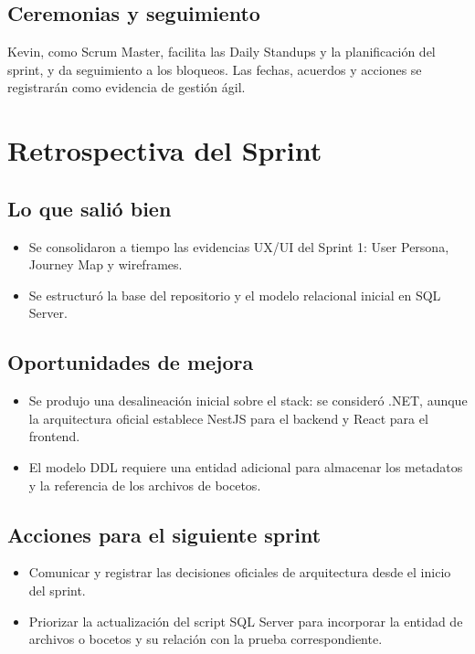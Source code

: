 \documentclass[12pt,a4paper]{article}
\begin{document}
\subsection{Ceremonias y seguimiento}
Kevin, como Scrum Master, facilita las Daily Standups y la planificación del sprint,
y da seguimiento a los bloqueos. Las fechas, acuerdos y acciones se registrarán como
evidencia de gestión ágil.

\section{Retrospectiva del Sprint}

\subsection{Lo que salió bien}
\begin{itemize}
    \item Se consolidaron a tiempo las evidencias UX/UI del Sprint 1: User Persona, Journey Map y wireframes.
    \item Se estructuró la base del repositorio y el modelo relacional inicial en SQL Server.
\end{itemize}

\subsection{Oportunidades de mejora}
\begin{itemize}
    \item Se produjo una desalineación inicial sobre el stack: se consideró .NET, aunque la arquitectura oficial establece NestJS para el backend y React para el frontend.
    \item El modelo DDL requiere una entidad adicional para almacenar los metadatos y la referencia de los archivos de bocetos.
\end{itemize}

\subsection{Acciones para el siguiente sprint}
\begin{itemize}
    \item Comunicar y registrar las decisiones oficiales de arquitectura desde el inicio del sprint.
    \item Priorizar la actualización del script SQL Server para incorporar la entidad de archivos o bocetos y su relación con la prueba correspondiente.
\end{itemize}
\end{document}
